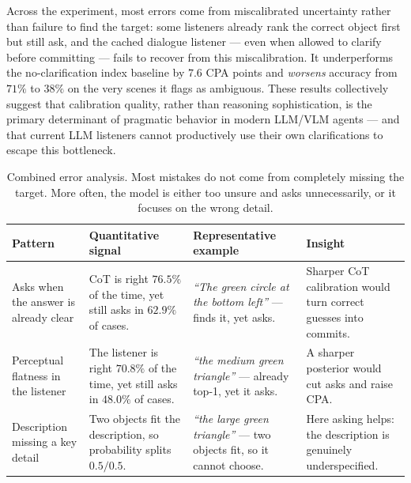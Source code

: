 \documentclass[11pt]{article}
\begin{document}
Across the experiment, most errors come from miscalibrated uncertainty rather than failure to find the target: some listeners already rank the correct object first but still ask, and the cached dialogue listener --- even when allowed to clarify before committing --- fails to recover from this miscalibration. It underperforms the no-clarification index baseline by $7.6$ CPA points and \emph{worsens} accuracy from $71\%$ to $38\%$ on the very scenes it flags as ambiguous. These results collectively suggest that calibration quality, rather than reasoning sophistication, is the primary determinant of pragmatic behavior in modern LLM/VLM agents --- and that current LLM listeners cannot productively use their own clarifications to escape this bottleneck.

\begin{table}[H]
\centering
\footnotesize
\setlength{\tabcolsep}{3pt}
\renewcommand{\arraystretch}{1.15}
\begin{tabular}{p{2.3cm}p{3.0cm}p{4.3cm}p{3.2cm}}
\toprule
Pattern & Quantitative signal & Representative example & Insight \\
\midrule

Asks when the answer is already clear &
CoT is right $76.5\%$ of the time, yet still asks in $62.9\%$ of cases. &
\textit{``The green circle at the bottom left''} --- finds it, yet asks. &
Sharper CoT calibration would turn correct guesses into commits. \\
\midrule

Perceptual flatness in the listener &
The listener is right $70.8\%$ of the time, yet still asks in $48.0\%$ of cases. &
\textit{``the medium green triangle''} --- already top-1, yet it asks. &
A sharper posterior would cut asks and raise CPA. \\
\midrule

Description missing a key detail &
Two objects fit the description, so probability splits $0.5/0.5$. &
\textit{``the large green triangle''} --- two objects fit, so it cannot choose. &
Here asking helps: the description is genuinely underspecified. \\

\bottomrule
\end{tabular}
\caption{Combined error analysis. Most mistakes do not come from completely missing the target. More often, the model is either too unsure and asks unnecessarily, or it focuses on the wrong detail.}
\label{tab:error-qualitative}
\end{table}
\end{document}
